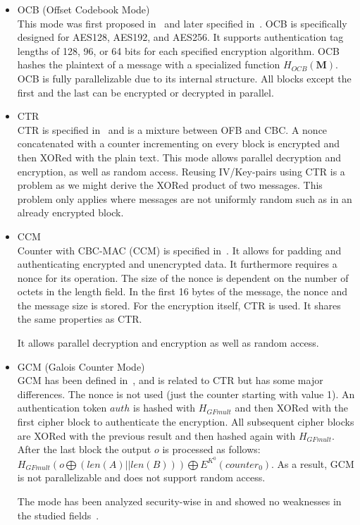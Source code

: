 \begin{itemize}
	\item OCB (Offset Codebook Mode)\\
	This mode was first proposed in~\cite{rogaway2003ocb} and later specified in~\cite{krovetz-ocb-04}. OCB is specifically designed for AES128, AES192, and AES256. It supports authentication tag lengths of 128, 96, or 64 bits for each specified encryption algorithm. OCB hashes the plaintext of a message with a specialized function $H_{OCB}(\mathbf{M})$. OCB is fully parallelizable due to its internal structure. All blocks except the first and the last can be encrypted or decrypted in parallel.
	\item CTR\\
	CTR is specified in~\cite{lipmaa2000ctr} and is a mixture between OFB and CBC. A nonce concatenated with a counter incrementing on every block is encrypted and then XORed with the plain text. This mode allows parallel decryption and encryption, as well as random access. Reusing IV/Key-pairs using CTR is a problem as we might derive the XORed product of two messages. This problem only applies where messages are not uniformly random such as in an already encrypted block.
	\item CCM\\
	Counter with CBC-MAC (CCM) is specified in~\cite{rfc3610}. It allows for padding and authenticating encrypted and unencrypted data. It furthermore requires a nonce for its operation. The size of the nonce is dependent on the number of octets in the length field. In the first 16 bytes of the message, the nonce and the message size is stored. For the encryption itself, CTR is used. It shares the same properties as CTR. 
	
	It allows parallel decryption and encryption as well as random access.
	\item GCM (Galois Counter Mode)\\
	GCM has been defined in~\cite{mcgrew2004galois}, and is related to CTR but has some major differences. The nonce is not used (just the counter starting with value 1). An authentication token $auth$ is hashed with $H_{GFmult}$ and then XORed with the first cipher block to authenticate the encryption. All subsequent cipher blocks are XORed with the previous result and then hashed again with $H_{GFmult}$. After the last block the output $o$ is processed  as follows: $H_{GFmult}(o\bigoplus (len(A)||len(B))) \bigoplus E^{K^0}(counter_0)$. As a result, GCM is not parallelizable and does not support random access.
	
	The mode has been analyzed security-wise in \citeyear{mcgrew2004security} and showed no weaknesses in the studied fields~\cite{mcgrew2004security}. 
	

\end{itemize}
